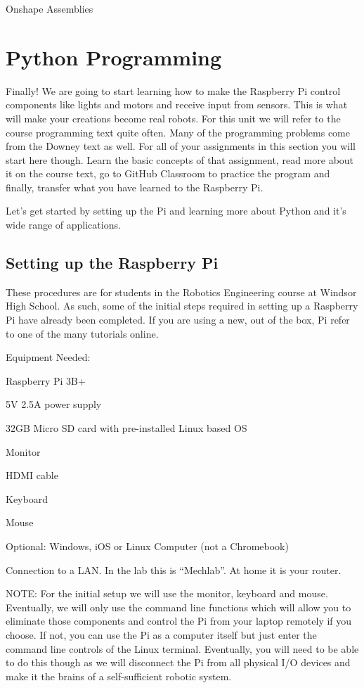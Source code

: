 \documentclass[
]{book}
\begin{document}
Onshape Assemblies

\hypertarget{python-programming}{%
\chapter{Python Programming}\label{python-programming}}

Finally! We are going to start learning how to make the Raspberry Pi control components like lights and motors and receive input from sensors. This is what will make your creations become real robots. For this unit we will refer to the course programming text quite often. Many of the programming problems come from the Downey text as well. For all of your assignments in this section you will start here though. Learn the basic concepts of that assignment, read more about it on the course text, go to GitHub Classroom to practice the program and finally, transfer what you have learned to the Raspberry Pi.

Let's get started by setting up the Pi and learning more about Python and it's wide range of applications.

\hypertarget{setting-up-the-raspberry-pi}{%
\section{Setting up the Raspberry Pi}\label{setting-up-the-raspberry-pi}}

These procedures are for students in the Robotics Engineering course at Windsor High School. As such, some of the initial steps required in setting up a Raspberry Pi have already been completed. If you are using a new, out of the box, Pi refer to one of the many tutorials online.

Equipment Needed:

Raspberry Pi 3B+

5V \textbar{} 2.5A power supply

32GB Micro SD card with pre-installed Linux based OS

Monitor

HDMI cable

Keyboard

Mouse

Optional: Windows, iOS or Linux Computer (not a Chromebook)

Connection to a LAN. In the lab this is ``Mechlab''. At home it is your router.

NOTE: For the initial setup we will use the monitor, keyboard and mouse. Eventually, we will only use the command line functions which will allow you to eliminate those components and control the Pi from your laptop remotely if you choose. If not, you can use the Pi as a computer itself but just enter the command line controls of the Linux terminal. Eventually, you will need to be able to do this though as we will disconnect the Pi from all physical I/O devices and make it the brains of a self-sufficient robotic system.
\end{document}
